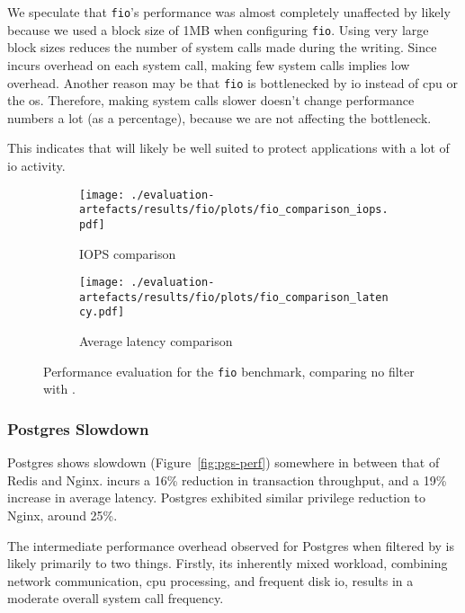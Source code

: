 We speculate that \texttt{fio}'s performance was almost completely
unaffected by \af likely because we used a block size of 1MB when
configuring \texttt{fio}. Using very large block sizes reduces the number of
system calls made during the writing. Since \af incurs overhead on each
system call, making few system calls implies low overhead. Another reason
may be that \texttt{fio} is bottlenecked by \ac{io} instead of \ac{cpu} or
the \ac{os}. Therefore, making system calls slower doesn't change performance
numbers a lot (as a percentage), because we are not affecting the bottleneck.

This indicates that \af will likely be well suited to protect applications with
a lot of \ac{io} activity.

\begin{figure}[htbp]
    \centering
    \begin{subfigure}[b]{0.48\textwidth}
        \centering
        \texttt{[image: ./evaluation-artefacts/results/fio/plots/fio\_comparison\_iops.pdf]}
        \caption{IOPS comparison}
        \label{fig:fio-iops}
    \end{subfigure}
    \hfill %
    \begin{subfigure}[b]{0.48\textwidth}
        \centering
        \texttt{[image: ./evaluation-artefacts/results/fio/plots/fio\_comparison\_latency.pdf]}
        \caption{Average latency comparison}
        \label{fig:fio-latency}
    \end{subfigure}

    \medskip %
    
    \caption{Performance evaluation for the \texttt{fio} benchmark, comparing no
    filter with \af{}.} %
    \label{fig:fio-perf}
\end{figure}

\subsubsection{Postgres Slowdown}\label{subsubsec:postgres-slowdown}

Postgres shows slowdown (Figure~\ref{fig:pgs-perf}) somewhere in between that
of Redis and Nginx. \af incurs a 16\% reduction in transaction throughput, and
a 19\% increase in average latency. Postgres exhibited similar privilege
reduction to Nginx, around 25\%. 

The intermediate performance overhead observed for Postgres when filtered
by \af is likely primarily to two things. Firstly, its inherently  mixed
workload, combining network communication, \ac{cpu} processing, and frequent
disk \ac{io}, results in a moderate overall system call frequency. 

